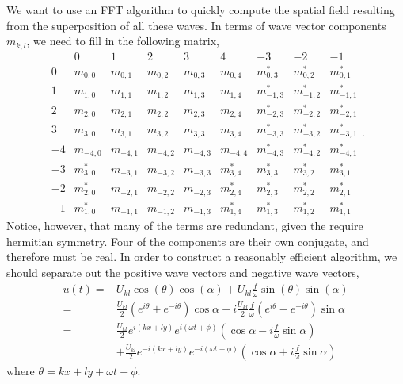 \documentclass[11pt]{amsart}
\begin{document}
We want to use an FFT algorithm to quickly compute the spatial field resulting from the superposition of all these waves. In terms of wave vector components $m_{k,l}$, we need to fill in the following matrix,
\begin{equation}
\begin{array}{c|ccccc|ccc} & 0 & 1 & 2 & 3 & 4 & -3 & -2 & -1 \\ \hline
0 & m_{0,0} & m_{0,1} & m_{0,2} & m_{0,3} & m_{0,4} & m_{0,3}^\ast & m_{0,2}^\ast & m_{0,1}^\ast \\
1 & m_{1,0} & m_{1,1} & m_{1,2} & m_{1,3} & m_{1,4} & m_{-1,3}^\ast & m_{-1,2}^\ast & m_{-1,1}^\ast \\
2 & m_{2,0} & m_{2,1} & m_{2,2} & m_{2,3} & m_{2,4} & m_{-2,3}^\ast & m_{-2,2}^\ast & m_{-2,1}^\ast \\
3 & m_{3,0} & m_{3,1} & m_{3,2} & m_{3,3} & m_{3,4} & m_{-3,3}^\ast & m_{-3,2}^\ast & m_{-3,1}^\ast \\
-4 & m_{-4,0} & m_{-4,1} & m_{-4,2} & m_{-4,3} & m_{-4,4} & m_{-4,3}^\ast & m_{-4,2}^\ast & m_{-4,1}^\ast \\
-3 & m_{3,0}^\ast & m_{-3,1} & m_{-3,2} & m_{-3,3} & m_{3,4}^\ast & m_{3,3}^\ast & m_{3,2}^\ast & m_{3,1}^\ast \\
-2 & m_{2,0}^\ast & m_{-2,1} & m_{-2,2} & m_{-2,3} & m_{2,4}^\ast & m_{2,3}^\ast & m_{2,2}^\ast & m_{2,1}^\ast \\
-1 & m_{1,0}^\ast & m_{-1,1} & m_{-1,2} & m_{-1,3} & m_{1,4}^\ast & m_{1,3}^\ast & m_{1,2}^\ast & m_{1,1}^\ast\end{array}.
\end{equation}
Notice, however, that many of the terms are redundant, given the require hermitian symmetry. Four of the components are their own conjugate, and therefore must be real. In order to construct a reasonably efficient algorithm, we should separate out the positive wave vectors and negative wave vectors,
\begin{align}
u(t) =& U_{kl} \cos( \theta ) \cos( \alpha) + U_{kl} \frac{f}{\omega} \sin( \theta ) \sin(\alpha) \\
=& \frac{U_{kl}}{2} \left( e^{i\theta} + e^{-i \theta} \right) \cos \alpha - i \frac{U_{kl}}{2} \frac{f}{\omega} \left( e^{i \theta} - e^{-i\theta} \right) \sin \alpha \\
=& \frac{U_{kl}}{2} e^{i(kx+ly)} e^{i(\omega t + \phi)} \left( \cos \alpha - i \frac{f}{\omega} \sin \alpha \right)  \\ \nonumber
&+ \frac{U_{kl}}{2} e^{-i(kx+ly)} e^{-i(\omega t + \phi)} \left( \cos \alpha + i \frac{f}{\omega} \sin \alpha \right) 
\end{align}
where $\theta = kx + ly + \omega t + \phi$.
\end{document}
